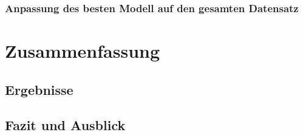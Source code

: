 \documentclass[a4paper,11pt]{article}
\begin{document}
\subsubsection{Anpassung des besten Modell auf den gesamten Datensatz}

\section{Zusammenfassung}

\subsection{Ergebnisse}
\subsection{Fazit und Ausblick}

\newpage

\printbibliography[
heading=bibintoc,
title={Literaturverzeichnis}
]
\end{document}
